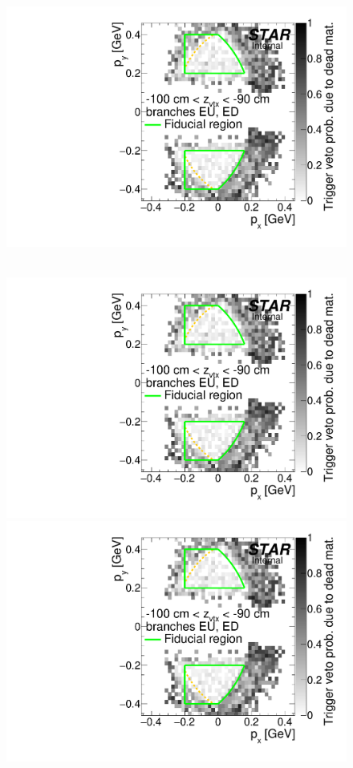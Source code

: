 \begin{figure}[hb]
{  \includegraphics[width=\linewidth,page=27]{graphics/corrections/mcDeadMatProbPxPy.pdf}
}~
\parbox{0.495\textwidth}{
  \centering
  \includegraphics[width=\linewidth,page=24]{graphics/corrections/mcDeadMatProbPxPy.pdf}\\
  \includegraphics[width=\linewidth,page=26]{graphics/corrections/mcDeadMatProbPxPy.pdf}\\
}
\end{figure}
